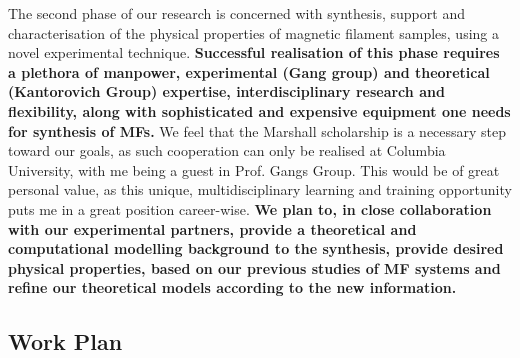 \documentclass{article}
\begin{document}
The second phase of our research is concerned with synthesis, support and characterisation of the physical properties of magnetic filament samples, using a novel experimental technique. \textbf{Successful realisation of this phase requires a plethora of manpower, experimental (Gang group) and theoretical  (Kantorovich Group) expertise, interdisciplinary research and flexibility, along with sophisticated and expensive equipment one needs for synthesis of MFs.} We feel that the Marshall scholarship is a necessary step toward our goals, as such cooperation can only be realised at Columbia University, with me being a guest in Prof. Gangs Group. This would be of great personal value, as this unique, multidisciplinary learning and training opportunity puts me in a great position career-wise. \textbf{We plan to, in close collaboration with our experimental partners, provide a theoretical and computational modelling background to the synthesis, provide desired physical properties, based on our previous studies of MF systems and refine our theoretical models according to the new information.}

\subsection{Work Plan}
\end{document}
